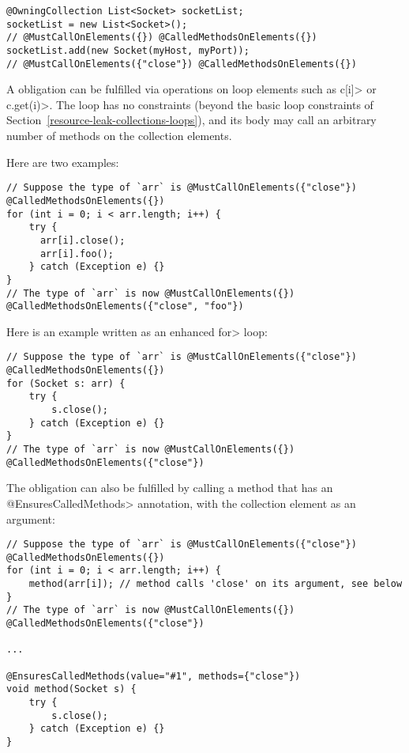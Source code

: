 \begin{verbatim}
@OwningCollection List<Socket> socketList;
socketList = new List<Socket>();
// @MustCallOnElements({}) @CalledMethodsOnElements({})
socketList.add(new Socket(myHost, myPort));
// @MustCallOnElements({"close"}) @CalledMethodsOnElements({})
\end{verbatim}



A \MustCallOnElements obligation can be fulfilled via operations on loop
elements such as \<c[i]> or \<c.get(i)>.
The loop has no constraints (beyond the basic loop constraints of
Section~\ref{resource-leak-collections-loops}), and its body may call an
arbitrary number of methods on the collection elements.

Here are two examples:

\begin{verbatim}
// Suppose the type of `arr` is @MustCallOnElements({"close"}) @CalledMethodsOnElements({})
for (int i = 0; i < arr.length; i++) {
    try {
      arr[i].close();
      arr[i].foo();
    } catch (Exception e) {}
}
// The type of `arr` is now @MustCallOnElements({}) @CalledMethodsOnElements({"close", "foo"})
\end{verbatim}

Here is an example written as an enhanced \<for> loop:

\begin{verbatim}
// Suppose the type of `arr` is @MustCallOnElements({"close"}) @CalledMethodsOnElements({})
for (Socket s: arr) {
    try {
        s.close();
    } catch (Exception e) {}
}
// The type of `arr` is now @MustCallOnElements({}) @CalledMethodsOnElements({"close"})
\end{verbatim}


The obligation can also be fulfilled by calling a method that has an
\<@EnsuresCalledMethods> annotation, with the collection element as an
argument:
\begin{verbatim}
// Suppose the type of `arr` is @MustCallOnElements({"close"}) @CalledMethodsOnElements({})
for (int i = 0; i < arr.length; i++) {
    method(arr[i]); // method calls 'close' on its argument, see below
}
// The type of `arr` is now @MustCallOnElements({}) @CalledMethodsOnElements({"close"})

...

@EnsuresCalledMethods(value="#1", methods={"close"})
void method(Socket s) {
    try {
        s.close();
    } catch (Exception e) {}
}
\end{verbatim}


